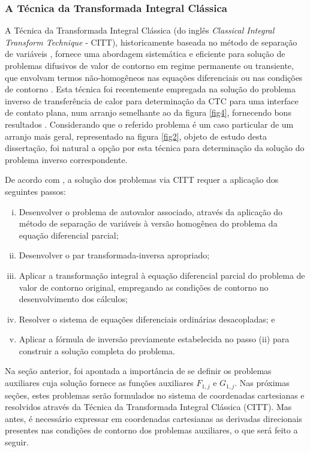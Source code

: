 \subsubsection{A Técnica da Transformada Integral Clássica}

A Técnica da Transformada Integral Clássica (do inglês \textit{Classical Integral Transform Technique} - CITT), historicamente baseada no método de separação de variáveis \citep{livro_boyce},
fornece uma abordagem sistemática e eficiente para solução
de problemas difusivos de valor de contorno em regime permanente ou transiente, que envolvam termos não-homogêneos nas equações diferenciais ou nas condições
de contorno \citep{livro_ozisik}. Esta técnica foi recentemente empregada na solução do problema inverso de transferência de calor para determinação da CTC para
uma interface de contato plana, num arranjo semelhante ao da figura \ref{fig4}, fornecendo bons resultados \citep{tese_padilha}. Considerando que o referido problema é um caso particular
de um arranjo mais geral, representado na figura \ref{fig2}, objeto de estudo desta dissertação, foi natural a opção por esta técnica para determinação da solução do problema inverso correspondente.


De acordo com \cite{livro_cotta}, a solução dos problemas via CITT requer a aplicação dos seguintes passos:
\begin{enumerate}[(i)]
  \item Desenvolver o problema de autovalor associado, através da aplicação do método de separação de variáveis à versão homogênea do problema da equação
  diferencial parcial;
  \item Desenvolver o par transformada-inversa apropriado;
  \item Aplicar a transformação integral à equação diferencial parcial do problema de valor de contorno original, empregando as condições de contorno no
  desenvolvimento dos cálculos;
  \item Resolver o sistema de equações diferenciais ordinárias desacopladas; e
  \item Aplicar a fórmula de inversão previamente estabelecida no passo (ii) para construir a solução completa do problema.
\end{enumerate}

Na seção anterior, foi apontada a importância de se definir os problemas auxiliares cuja solução fornece as funções auxiliares $F_{1,j}$ e $G_{1,j}$.
Nas próximas seções, estes problemas serão formulados no sistema de coordenadas cartesianas e resolvidos através da Técnica da Transformada Integral Clássica (CITT). Mas antes, é necessário
expressar em coordenadas cartesianas as derivadas direcionais presentes nas condições de contorno dos problemas auxiliares, o que
será feito a seguir.

